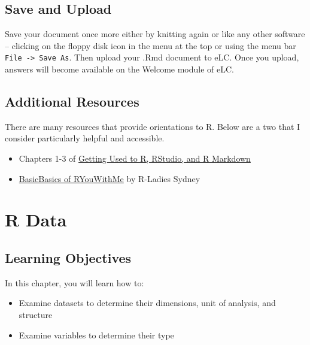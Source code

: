 \documentclass[
]{book}
\providecommand{\tightlist}{%
  \setlength{\itemsep}{0pt}\setlength{\parskip}{0pt}}
\begin{document}
\hypertarget{save-and-upload}{%
\section{Save and Upload}\label{save-and-upload}}

Save your document once more either by knitting again or like any other software -- clicking on the floppy disk icon in the menu at the top or using the menu bar \texttt{File\ -\textgreater{}\ Save\ As}. Then upload your .Rmd document to eLC. Once you upload, answers will become available on the Welcome module of eLC.

\hypertarget{additional-resources}{%
\section{Additional Resources}\label{additional-resources}}

There are many resources that provide orientations to R. Below are a two that I consider particularly helpful and accessible.

\begin{itemize}
\tightlist
\item
  Chapters 1-3 of \href{https://rbasics.netlify.app/index.html}{Getting Used to R, RStudio, and R Markdown}
\item
  \href{https://rladiessydney.org/courses/ryouwithme/01-basicbasics-0/}{BasicBasics of RYouWithMe} by R-Ladies Sydney
\end{itemize}

\hypertarget{r-data}{%
\chapter{R Data}\label{r-data}}

\hypertarget{learning-objectives}{%
\section{Learning Objectives}\label{learning-objectives}}

In this chapter, you will learn how to:

\begin{itemize}
\tightlist
\item
  Examine datasets to determine their dimensions, unit of analysis, and structure
\item
  Examine variables to determine their type
\end{itemize}
\end{document}
